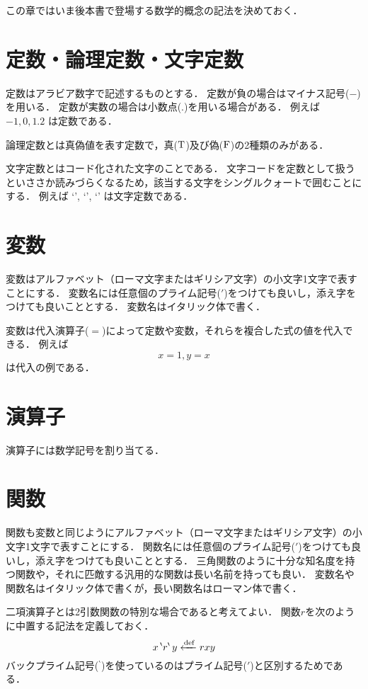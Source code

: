 \documentclass[twocolumn]{jsbook}
\begin{document}
この章ではいま後本書で登場する数学的概念の記法を決めておく．

\section{定数・論理定数・文字定数}

定数はアラビア数字で記述するものとする．
定数が負の場合はマイナス記号($-$)を用いる．
定数が実数の場合は小数点($.$)を用いる場合がある．
例えば $-1, 0, 1.2$ は定数である．

論理定数とは真偽値を表す定数で，真($\text{T}$)及び偽($\text{F}$)の2種類のみがある．

文字定数とはコード化された文字のことである．
文字コードを定数として扱うといささか読みづらくなるため，該当する文字をシングルクォートで囲むことにする．
例えば `', `', `' は文字定数である．

\section{変数}

変数はアルファベット（ローマ文字またはギリシア文字）の小文字1文字で表すことにする．
変数名には任意個のプライム記号($'$)をつけても良いし，添え字をつけても良いこととする．
変数名はイタリック体で書く．

変数は代入演算子($=$)によって定数や変数，それらを複合した式の値を代入できる．
例えば $$x=1, y=x$$ は代入の例である．

\section{演算子}

演算子には数学記号を割り当てる．


\section{関数}

関数も変数と同じようにアルファベット（ローマ文字またはギリシア文字）の小文字1文字で表すことにする．
関数名には任意個のプライム記号($'$)をつけても良いし，添え字をつけても良いこととする．
三角関数のように十分な知名度を持つ関数や，それに匹敵する汎用的な関数は長い名前を持っても良い．
変数名や関数名はイタリック体で書くが，長い関数名はローマン体で書く．


二項演算子とは2引数関数の特別な場合であると考えてよい．
関数$r$を次のように中置する記法を定義しておく．
$$x\,{}^\backprime r^\backprime\,y\xleftarrow{\text{def}} rxy$$
バックプライム記号(${}^\backprime$)を使っているのはプライム記号($'$)と区別するためである．
\end{document}
